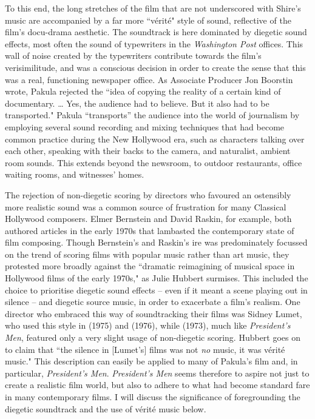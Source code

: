 To this end, the long stretches of the film that are not underscored with Shire's music are accompanied by a far more ``vérité" style of sound, reflective of the film's docu-drama aesthetic.
The soundtrack is here dominated by diegetic sound effects, most often the sound of typewriters in the \textit{Washington Post} offices.
This wall of noise created by the typewriters contribute towards the film's verisimilitude, and was a conscious decision in order to create the sense that this was a real, functioning newspaper office.\autocites[In order to maximise this sense of realism, Pakula had the crew build an exact replica of the \textit{Washington Post} offices which they ``decorated with trash transported from the real one in Washington."][]{boorstin_its_2016}
As Associate Producer Jon Boorstin wrote, Pakula rejected the ``idea of copying the reality of a certain kind of documentary. … Yes, the audience had to believe. But it also had to be transported."
Pakula ``transports” the audience into the world of journalism by employing several sound recording and mixing techniques that had become common practice during the New Hollywood era, such as characters talking over each other, speaking with their backs to the camera, and naturalist, ambient room sounds.
This extends beyond the newsroom, to outdoor restaurants, office waiting rooms, and witnesses' homes.

The rejection of non-diegetic scoring by directors who favoured an ostensibly more realistic sound was a common source of frustration for many Classical Hollywood composers.
Elmer Bernstein and David Raskin, for example, both authored articles in the early 1970s that lambasted the contemporary state of film composing.
Though Bernstein's and Raskin's ire was predominately focussed on the trend of scoring films with popular music rather than art music, they protested more broadly against the ``dramatic reimagining of musical space in Hollywood films of the early 1970s," as Julie Hubbert surmises.\autocites[][207]{hubbert_whatever_2003}
This included the choice to prioritise diegetic sound effects – even if it meant a scene playing out in silence – and diegetic source music, in order to exacerbate a film's realism.
One director who embraced this way of soundtracking their films was Sidney Lumet, who used this style in  (1975) and  (1976), while  (1973), much like \textit{President's Men}, featured only a very slight usage of non-diegetic scoring.
Hubbert goes on to claim that ``the silence in [Lumet's] films was not \textit{no} music, it was vérité music."\autocites[][195]{hubbert_whatever_2003}
This description can easily be applied to many of Pakula's film and, in particular, \textit{President's Men}.
\textit{President's Men} seems therefore to aspire not just to create a realistic film world, but also to adhere to what had become standard fare in many contemporary films.
I will discuss the significance of foregrounding the diegetic soundtrack and the use of vérité music below.



